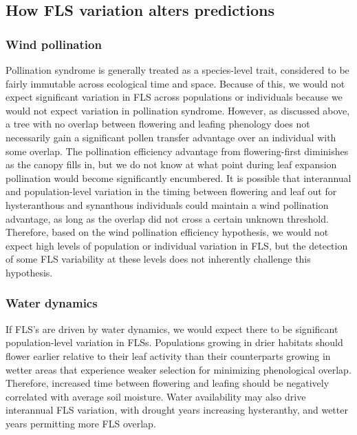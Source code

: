\documentclass[12pt]{article}
\begin{document}
\subsection*{How FLS variation alters predictions}
\subsubsection*{Wind pollination} 
\indent\indent  Pollination syndrome is generally treated as a species-level trait, considered to be fairly immutable across ecological time and space. Because of this, we would not expect significant variation in FLS across populations or individuals because we would not expect variation in pollination syndrome. However, as discussed above, a tree with no overlap between flowering and leafing phenology does not necessarily gain a significant pollen transfer advantage over an individual with some overlap. The pollination efficiency advantage from flowering-first diminishes as the canopy fills in, but  we do not know at what point during leaf expansion pollination would become significantly encumbered. It is possible that interannual and population-level variation in the timing between flowering and leaf out for hysteranthous and synanthous individuals could maintain a wind pollination advantage, as long as the overlap did not cross a certain unknown threshold. Therefore, based on the wind pollination efficiency hypothesis, we would not expect high levels of population or individual variation in FLS, but the detection of some FLS variability at these levels does not inherently challenge this hypothesis.
\subsubsection*{Water dynamics} 
\indent\indent If FLS's are driven by water dynamics, we would expect there to be significant population-level variation in FLSs. Populations growing in drier habitats should flower earlier relative to their leaf activity than their counterparts growing in wetter areas that experience weaker selection for minimizing phenological overlap. Therefore, increased time between flowering and leafing should be negatively correlated with average soil moisture. Water availability may also drive interannual FLS variation, with drought years increasing hysteranthy, and wetter years permitting more FLS overlap. 
\end{document}

